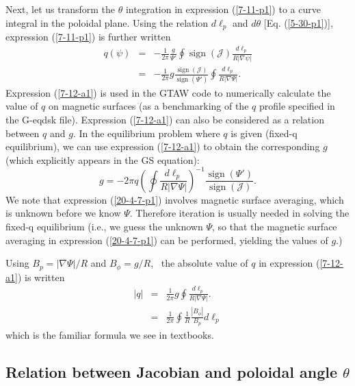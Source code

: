 \documentclass{llncs}
\newcommand{\tmop}[1]{\ensuremath{\operatorname{#1}}}
\begin{document}
Next, let us transform the $\theta$ integration in expression (\ref{7-11-p1})
to a curve integral in the poloidal plane. Using the relation $d \ell_p$ and
$d \theta$ [Eq. (\ref{5-30-p1})], expression (\ref{7-11-p1}) is further
written
\begin{eqnarray}
  q (\psi) & = & - \frac{1}{2 \pi}  \frac{g}{\Psi'} \oint \tmop{sign}
  (\mathcal{J}) \frac{d \ell_p}{R | \nabla \psi |} \nonumber\\
  & = & - \frac{1}{2 \pi} g \frac{\tmop{sign} (\mathcal{J})}{\tmop{sign}
  (\Psi')} \oint \frac{d \ell_p}{R | \nabla \Psi |} .  \label{7-12-a1}
\end{eqnarray}
Expression (\ref{7-12-a1}) is used in the GTAW code to numerically calculate
the value of $q$ on magnetic surfaces (as a benchmarking of the $q$ profile
specified in the G-eqdsk file). Expression (\ref{7-12-a1}) can also be
considered as a relation between $q$ and $g$. In the equilibrium problem where
$q$ is given (fixed-q equilibrium), we can use expression (\ref{7-12-a1}) to
obtain the corresponding $g$ (which explicitly appears in the GS equation):
\begin{equation}
  \label{20-4-7-p1} g = - 2 \pi q \left( \oint \frac{d \ell_p}{R| \nabla \Psi
  |} \right)^{- 1} \frac{\tmop{sign} (\Psi')}{\tmop{sign} (\mathcal{J})} .
\end{equation}
We note that expression (\ref{20-4-7-p1}) involves magnetic surface averaging,
which is unknown before we know $\Psi$. Therefore iteration is usually needed
in solving the fixed-q equilibrium (i.e., we guess the unknown $\Psi$, so that
the magnetic surface averaging in expression (\ref{20-4-7-p1}) can be
performed, yielding the values of $g$.)

Using $B_p = | \nabla \Psi | / R$ and $B_{\phi} = g / R$, \ the absolute value
of $q$ in expression (\ref{7-12-a1}) is written
\begin{eqnarray}
  |q| & = & \frac{1}{2 \pi} g \oint \frac{d \ell_p}{R | \nabla \Psi |} . \\
  & = & \frac{1}{2 \pi} \oint \frac{1}{R}  \frac{|B_{\phi} |}{B_p} d \ell_p 
\end{eqnarray}
which is the familiar formula we see in textbooks.

\subsection{Relation between Jacobian and poloidal angle
$\theta$}\label{3-13-p7}
\end{document}
